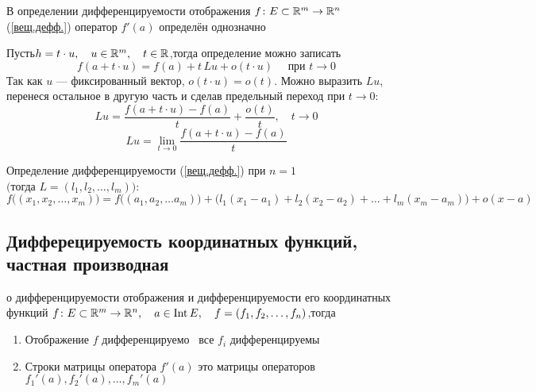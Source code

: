 \begin{utv}[https://www.youtube.com/live/4EMkUsyQQec?si=0fMr1jMMAaXiihPe&t=8668]
	В определении дифференцируемости отображения $f \colon E \subset \mathbb R^m \to \mathbb R^n$ (\ref{вещ.дефф.}) оператор $f'(a)$ определён однозначно
\end{utv} %

\begin{prf} %
	Пусть\quad $h = t \cdot u,\quad u \in \mathbb R^m,\quad t \in \mathbb R$,\quad тогда определение можно записать
	\[f(a + t\cdot u) = f(a) + t\, Lu + o(t \cdot u) \quad \text{ при } t \to 0\]
	Так как $u$ --- фиксированный вектор, $o(t\cdot u) = o(t)$. Можно выразить $Lu$, перенеся остальное в другую часть и сделав предельный переход при $t \to 0$:
	\[Lu = \frac{f(a + t\cdot u) - f(a)}{t} + \frac{o(t)}{t}, \quad t \to 0\]
	\[Lu = \lim_{t \to 0} \frac{f(a + t\cdot u) - f(a)}{t}\]
\end{prf} %

\begin{zam}[https://www.youtube.com/live/4EMkUsyQQec?si=AKhiCvQ6hFwjJs53&t=8943]\label{дефф.1}
	Определение дифференцируемости (\ref{вещ.дефф.}) при $n = 1$ $\bigr(\text{тогда } L=(l_1, l_2, \dots, l_m)\bigl)$:
	\[f\bigl((x_1, x_2, \dots, x_m)\bigr) = f\bigl((a_1, a_2, \dots a_m)\bigr) + \bigl(l_1(x_1 - a_1) + l_2(x_2 - a_2) + \dots + l_m(x_m - a_m)\bigr) + o(x - a)\]
\end{zam}%

\subsection{Дифферецируемость координатных функций, частная производная}

\begin{lem}[https://www.youtube.com/live/4EMkUsyQQec?si=Yn2iSTItfMzy3zqh&t=9366]{о дифференцируемости отображения и дифференцируемости его координатных функций}
\label{дефф.коорд.ф.}
	$f \colon E \subset \mathbb R^m \to \mathbb R^n,\quad a \in \mathrm{Int}\, E,\quad f = (f_1, f_2, \dots, f_n)$,\quad тогда
	\begin{enumerate}
		\item Отображение $f$ дифференцируемо \eq\ все $f_i$ дифференцируемы 
		
		\item Строки матрицы оператора $f'(a)$ это матрицы операторов $f_1'(a), f_2'(a), \dots, f_m'(a)$
	\end{enumerate}
\end{lem}%

